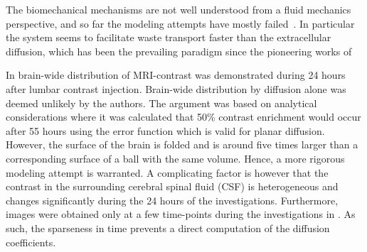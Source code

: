 \documentclass[12pt,a4paper]{article}
\newcommand{\kam}[1]{\textcolor{blue}{#1}}
\begin{document}
The biomechanical mechanisms are not well understood from a fluid mechanics perspective,
and so far the modeling attempts have mostly failed~\cite{asgari2016glymphatic, holter2017interstitial, smith2017glymphatic}. 
In particular the system seems to facilitate waste transport faster than  
the extracellular diffusion, which has been the prevailing paradigm since the pioneering works of \citet{sykova2008diffusion}



In \cite{ringstad2018brain} brain-wide distribution of MRI-contrast was demonstrated during 24 hours after lumbar contrast injection. Brain-wide distribution by diffusion alone was deemed unlikely by the authors. The argument was based on analytical considerations where it was calculated that 50\% contrast enrichment would occur after 
55 hours using the error function which is valid for planar diffusion. However, 
the surface of the brain is folded and is around five times larger than 
a corresponding surface of a ball with the same volume. Hence, 
a more rigorous modeling attempt is warranted. A complicating factor
is however that the contrast in the surrounding cerebral spinal fluid (CSF) is heterogeneous
and changes significantly during the 24 hours of the investigations. 
Furthermore, images were obtained only at a few time-points during the investigations in \cite{ringstad2018brain}. As such, the sparseness in time prevents a direct computation of the diffusion coefficients.
\end{document}
